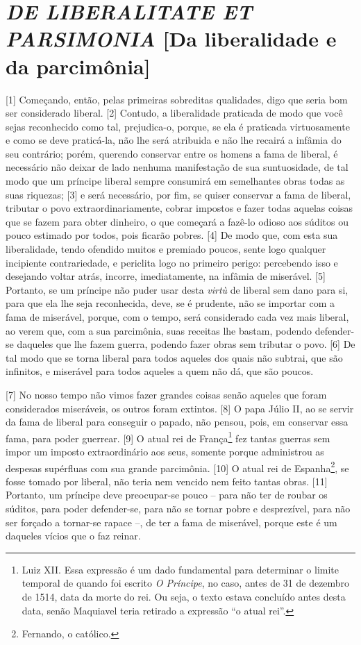 \quebra\section{\emph{DE LIBERALITATE ET PARSIMONIA}
{[}Da liberalidade e da parcimônia{]}}

{[}1{]} Começando, então, pelas primeiras sobreditas qualidades, digo
que seria bom ser considerado liberal. {[}2{]} Contudo, a liberalidade
praticada de modo que você sejas reconhecido como tal, prejudica-o,
porque, se ela é praticada virtuosamente e como se deve praticá-la, não
lhe será atribuida e não lhe recairá a infâmia do seu contrário; porém,
querendo conservar entre os homens a fama de liberal, é necessário não
deixar de lado nenhuma manifestação de sua suntuosidade, de tal modo que
um príncipe liberal sempre consumirá em semelhantes obras todas as suas
riquezas; {[}3{]} e será necessário, por fim, se quiser conservar a fama
de liberal, tributar o povo extraordinariamente, cobrar impostos e fazer
todas aquelas coisas que se fazem para obter dinheiro, o que começará a
fazê-lo odioso aos súditos ou pouco estimado por todos, pois ficarão
pobres. {[}4{]} De modo que, com esta sua liberalidade, tendo ofendido
muitos e premiado poucos, sente logo qualquer incipiente contrariedade,
e periclita logo no primeiro perigo: percebendo isso e desejando voltar
atrás, incorre, imediatamente, na infâmia de miserável. {[}5{]}
Portanto, se um príncipe não puder usar desta \emph{virtù} de liberal
sem dano para si, para que ela lhe seja reconhecida, deve, se é
prudente, não se importar com a fama de miserável, porque, com o tempo,
será considerado cada vez mais liberal, ao verem que, com a sua
parcimônia, suas receitas lhe bastam, podendo defender-se daqueles que
lhe fazem guerra, podendo fazer obras sem tributar o povo. {[}6{]} De
tal modo que se torna liberal para todos aqueles dos quais não subtrai,
que são infinitos, e miserável para todos aqueles a quem não dá, que são
poucos.

{[}7{]} No nosso tempo não vimos fazer grandes coisas senão aqueles que
foram considerados miseráveis, os outros foram extintos. {[}8{]} O papa
Júlio II, ao se servir da fama de liberal para conseguir o papado, não
pensou, pois, em conservar essa fama, para poder guerrear. {[}9{]} O
atual rei de França\footnote{Luiz XII. Essa expressão é um dado
  fundamental para determinar o limite temporal de quando foi escrito
  \emph{O Príncipe}, no caso, antes de 31 de dezembro de 1514, data da
  morte do rei. Ou seja, o texto estava concluído antes desta data,
  senão Maquiavel teria retirado a expressão ``o atual rei''.} fez
tantas guerras sem impor um imposto extraordinário aos seus, somente
porque administrou as despesas supérfluas com sua grande parcimônia.
{[}10{]} O atual rei de Espanha\footnote{Fernando, o católico.}, se
fosse tomado por liberal, não teria nem vencido nem feito tantas obras.
{[}11{]} Portanto, um príncipe deve preocupar-se pouco -- para não ter
de roubar os súditos, para poder defender-se, para não se tornar pobre e
desprezível, para não ser forçado a tornar-se rapace --, de ter a fama
de miserável, porque este é um daqueles vícios que o faz reinar.

